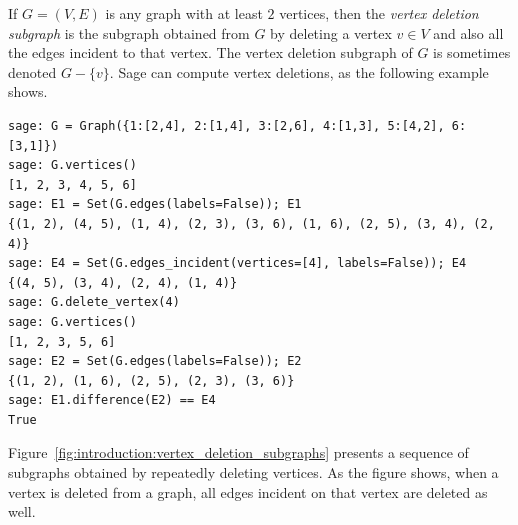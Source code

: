 If $G = (V,E)$ is any graph with at least $2$ vertices, then the
\emph{vertex deletion subgraph} is the subgraph obtained from $G$ by
deleting a vertex $v \in V$ and also all the edges incident to that
vertex. The vertex deletion subgraph of $G$ is sometimes denoted
$G - \{v\}$.
Sage can compute vertex deletions, as the following example shows.
\begin{lstlisting}
sage: G = Graph({1:[2,4], 2:[1,4], 3:[2,6], 4:[1,3], 5:[4,2], 6:[3,1]})
sage: G.vertices()
[1, 2, 3, 4, 5, 6]
sage: E1 = Set(G.edges(labels=False)); E1
{(1, 2), (4, 5), (1, 4), (2, 3), (3, 6), (1, 6), (2, 5), (3, 4), (2, 4)}
sage: E4 = Set(G.edges_incident(vertices=[4], labels=False)); E4
{(4, 5), (3, 4), (2, 4), (1, 4)}
sage: G.delete_vertex(4)
sage: G.vertices()
[1, 2, 3, 5, 6]
sage: E2 = Set(G.edges(labels=False)); E2
{(1, 2), (1, 6), (2, 5), (2, 3), (3, 6)}
sage: E1.difference(E2) == E4
True
\end{lstlisting}
Figure~\ref{fig:introduction:vertex_deletion_subgraphs}
presents a sequence of subgraphs obtained by repeatedly deleting
vertices. As the figure shows, when a vertex is deleted from a graph,
all edges incident on that vertex are deleted as well.

